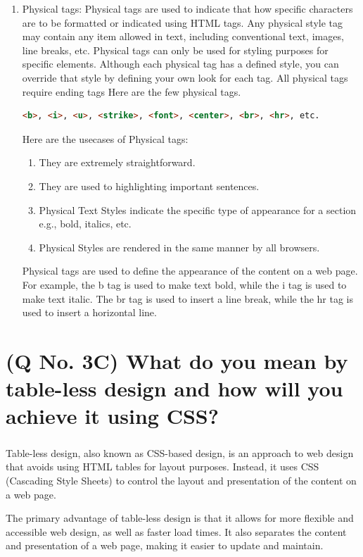 \documentclass[11pt]{article}
\begin{document}
\begin{enumerate}
    \item Physical tags:
    Physical tags are used to indicate that how specific characters are to be formatted or indicated using HTML tags. Any physical style tag may contain any item allowed in text, including conventional text, images, line breaks, etc. Physical tags can only be used for styling purposes for specific elements. Although each physical tag has a defined style, you can override that style by defining your own look for each tag. All physical tags require ending tags
    Here are the few physical tags.
    \begin{lstlisting}[language=html, caption=physical tags]
    <b>, <i>, <u>, <strike>, <font>, <center>, <br>, <hr>, etc.
    \end{lstlisting} 
    Here are the usecases of Physical tags:
    \begin{enumerate}
        \item  They are extremely straightforward.
        \item  They are used to highlighting important sentences.
        \item  Physical Text Styles indicate the specific type of appearance for a section e.g., bold, italics, etc.
        \item  Physical Styles are rendered in the same manner by all browsers.
    \end{enumerate}
    Physical tags are used to define the appearance of the content on a web page. For example, the \textlangle b \textrangle tag is used to make text bold, while the \textlangle i \textrangle  tag is used to make text italic. The \textlangle br \textrangle tag is used to insert a line break, while the \textlangle hr \textrangle tag is used to insert a horizontal line.

\end{enumerate}


\section{(Q No. 3C) What do you mean by table-less design and how will you achieve it using CSS?}
\subparagraph{}
    Table-less design, also known as CSS-based design, is an approach to web design that avoids using HTML tables for layout purposes. Instead, it uses CSS (Cascading Style Sheets) to control the layout and presentation of the content on a web page.

    The primary advantage of table-less design is that it allows for more flexible and accessible web design, as well as faster load times. It also separates the content and presentation of a web page, making it easier to update and maintain.
    
\end{document}
